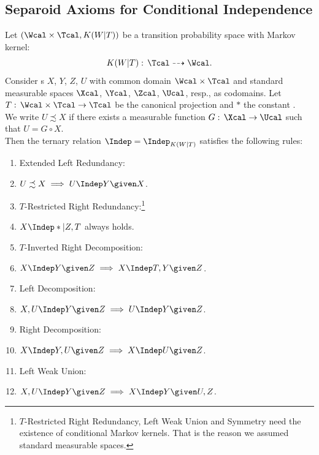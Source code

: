 \newpage
\subsection{Separoid Axioms for Conditional Independence}

\begin{DefThm}
    \label{ci-separoid-axioms}
    Let $(\Wcal \times \Tcal, K(W|T))$ be a transition probability space with Markov kernel:
\[K(W|T): \, \Tcal \dashrightarrow  \Wcal.\]
Consider \trv{}s $X$, $Y$, $Z$, $U$ with common domain $\Wcal\times \Tcal$ and standard measurable spaces $\Xcal$, 
$\Ycal$, $\Zcal$, $\Ucal$, resp., as codomains.
Let $T:\, \Wcal \times \Tcal \to \Tcal$ be the canonical projection and $\ast$ the constant \trv{}.\\
We write $U \precsim X$ if there exists a measurable function %
$G:\, \Xcal \to \Ucal$ 
such that $U = G \circ X$.\\
Then the ternary relation $\Indep = \Indep_{K(W|T)}$ satisfies the following rules:
\begin{enumerate}[label=\alph*)]
	\item Extended Left Redundancy: 
    \item[] $U \precsim X \implies U \Indep  Y \given X$.
    \item $T$-Restricted Right Redundancy:\footnote{\label{fn:sep-ax-std} $T$-Restricted Right Redundancy, Left Weak Union and Symmetry need the existence of conditional Markov kernels. That is the reason we assumed standard measurable spaces.}
    \item[] $X\Indep \ast|Z,T$ always holds.
    \item $T$-Inverted Right Decomposition:
    \item[] $X \Indep  Y \given Z \implies X \Indep  T, Y \given Z$.
	\item Left Decomposition:  
	\item[]$X,U \Indep  Y \given Z \implies U \Indep  Y \given Z$.
  \item Right Decomposition:  	
    \item[] $X \Indep  Y,U \given Z \implies X \Indep  U \given Z$.
    \item Left Weak Union:
    \item[] $X , U \Indep  Y  \given Z \implies X \Indep  Y \given U , Z$.

\end{enumerate}
\end{DefThm}

